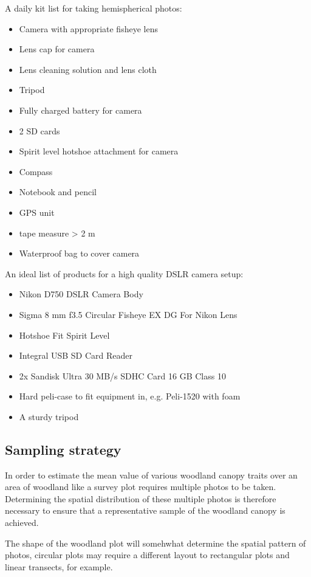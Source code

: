 \documentclass{article}
\begin{document}
A daily kit list for taking hemispherical photos:

\begin{itemize}
	\item{Camera with appropriate fisheye lens}
	\item{Lens cap for camera}
	\item{Lens cleaning solution and lens cloth}
	\item{Tripod}
	\item{Fully charged battery for camera}
	\item{2 SD cards}
	\item{Spirit level hotshoe attachment for camera}
	\item{Compass}
	\item{Notebook and pencil}
	\item{GPS unit}
	\item{tape measure > 2 m}
	\item{Waterproof bag to cover camera}
\end{itemize}

An ideal list of products for a high quality DSLR camera setup:

\begin{itemize}
	\item{Nikon D750 DSLR Camera Body}
	\item{Sigma 8 mm f3.5 Circular Fisheye EX DG For Nikon Lens}
	\item{Hotshoe Fit Spirit Level}
	\item{Integral USB SD Card Reader}
	\item{2x Sandisk Ultra 30 MB/s SDHC Card 16 GB Class 10}
	\item{Hard peli-case to fit equipment in, e.g. Peli-1520 with foam}
	\item{A sturdy tripod}
\end{itemize}

\subsection{Sampling strategy}

In order to estimate the mean value of various woodland canopy traits over an area of woodland like a survey plot requires multiple photos to be taken. Determining the spatial distribution of these multiple photos is therefore necessary to ensure that a representative sample of the woodland canopy is achieved. 

The shape of the woodland plot will somehwhat determine the spatial pattern of photos, circular plots may require a different layout to rectangular plots and linear transects, for example.
\end{document}
